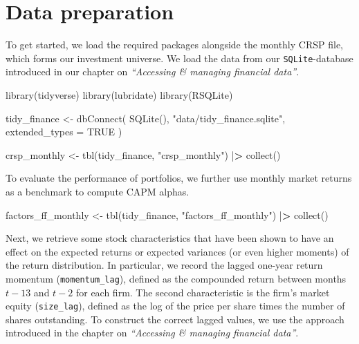 \documentclass[
]{book}
\newenvironment{Shaded}{\begin{snugshade}}{\end{snugshade}}
\newcommand{\AttributeTok}[1]{\textcolor[rgb]{0.61,0.61,0.61}{#1}}
\newcommand{\ConstantTok}[1]{\textcolor[rgb]{0,0,0}{#1}}
\newcommand{\ErrorTok}[1]{\textcolor[rgb]{0.14,0.14,0.14}{\textbf{#1}}}
\newcommand{\FunctionTok}[1]{\textcolor[rgb]{0,0,0}{#1}}
\newcommand{\NormalTok}[1]{#1}
\newcommand{\OtherTok}[1]{\textcolor[rgb]{0.37,0.37,0.37}{#1}}
\newcommand{\SpecialCharTok}[1]{\textcolor[rgb]{0,0,0}{#1}}
\newcommand{\StringTok}[1]{\textcolor[rgb]{0.5,0.5,0.5}{#1}}
\begin{document}
\hypertarget{data-preparation-6}{%
\section{Data preparation}\label{data-preparation-6}}

To get started, we load the required packages alongside the monthly CRSP file, which forms our investment universe. We load the data from our \texttt{SQLite}-database introduced in our chapter on \emph{``Accessing \& managing financial data''}.

\begin{Shaded}
\begin{Highlighting}[]
\FunctionTok{library}\NormalTok{(tidyverse)}
\FunctionTok{library}\NormalTok{(lubridate)}
\FunctionTok{library}\NormalTok{(RSQLite)}
\end{Highlighting}
\end{Shaded}

\begin{Shaded}
\begin{Highlighting}[]
\NormalTok{tidy\_finance }\OtherTok{\textless{}{-}} \FunctionTok{dbConnect}\NormalTok{(}
  \FunctionTok{SQLite}\NormalTok{(), }\StringTok{"data/tidy\_finance.sqlite"}\NormalTok{, }\AttributeTok{extended\_types =} \ConstantTok{TRUE}
\NormalTok{)}

\NormalTok{crsp\_monthly }\OtherTok{\textless{}{-}} \FunctionTok{tbl}\NormalTok{(tidy\_finance, }\StringTok{"crsp\_monthly"}\NormalTok{) }\SpecialCharTok{|}\ErrorTok{\textgreater{}}
  \FunctionTok{collect}\NormalTok{()}
\end{Highlighting}
\end{Shaded}

To evaluate the performance of portfolios, we further use monthly market returns as a benchmark to compute CAPM alphas.

\begin{Shaded}
\begin{Highlighting}[]
\NormalTok{factors\_ff\_monthly }\OtherTok{\textless{}{-}} \FunctionTok{tbl}\NormalTok{(tidy\_finance, }\StringTok{"factors\_ff\_monthly"}\NormalTok{) }\SpecialCharTok{|}\ErrorTok{\textgreater{}}
  \FunctionTok{collect}\NormalTok{()}
\end{Highlighting}
\end{Shaded}

Next, we retrieve some stock characteristics that have been shown to have an effect on the expected returns or expected variances (or even higher moments) of the return distribution. In particular, we record the lagged one-year return momentum (\texttt{momentum\_lag}), defined as the compounded return between months \(t − 13\) and \(t − 2\) for each firm. The second characteristic is the firm's market equity (\texttt{size\_lag}), defined as the log of the price per share times the number of shares outstanding. To construct the correct lagged values, we use the approach introduced in the chapter on \emph{``Accessing \& managing financial data''}.
\end{document}

